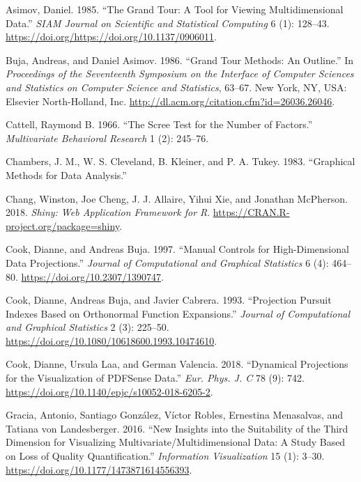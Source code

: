 \documentclass[11,]{article}
\begin{document}
\leavevmode\hypertarget{ref-asimov_grand_1985}{}%
Asimov, Daniel. 1985. ``The Grand Tour: A Tool for Viewing Multidimensional Data.'' \emph{SIAM Journal on Scientific and Statistical Computing} 6 (1): 128--43. \url{https://doi.org/https://doi.org/10.1137/0906011}.

\leavevmode\hypertarget{ref-buja_grand_1986}{}%
Buja, Andreas, and Daniel Asimov. 1986. ``Grand Tour Methods: An Outline.'' In \emph{Proceedings of the Seventeenth Symposium on the Interface of Computer Sciences and Statistics on Computer Science and Statistics}, 63--67. New York, NY, USA: Elsevier North-Holland, Inc. \url{http://dl.acm.org/citation.cfm?id=26036.26046}.

\leavevmode\hypertarget{ref-cattell_scree_1966}{}%
Cattell, Raymond B. 1966. ``The Scree Test for the Number of Factors.'' \emph{Multivariate Behavioral Research} 1 (2): 245--76.

\leavevmode\hypertarget{ref-chambers_graphical_1983}{}%
Chambers, J. M., W. S. Cleveland, B. Kleiner, and P. A. Tukey. 1983. ``Graphical Methods for Data Analysis.''

\leavevmode\hypertarget{ref-chang_shiny:_2018}{}%
Chang, Winston, Joe Cheng, J. J. Allaire, Yihui Xie, and Jonathan McPherson. 2018. \emph{Shiny: Web Application Framework for R}. \url{https://CRAN.R-project.org/package=shiny}.

\leavevmode\hypertarget{ref-cook_manual_1997}{}%
Cook, Dianne, and Andreas Buja. 1997. ``Manual Controls for High-Dimensional Data Projections.'' \emph{Journal of Computational and Graphical Statistics} 6 (4): 464--80. \url{https://doi.org/10.2307/1390747}.

\leavevmode\hypertarget{ref-cook_projection_1993}{}%
Cook, Dianne, Andreas Buja, and Javier Cabrera. 1993. ``Projection Pursuit Indexes Based on Orthonormal Function Expansions.'' \emph{Journal of Computational and Graphical Statistics} 2 (3): 225--50. \url{https://doi.org/10.1080/10618600.1993.10474610}.

\leavevmode\hypertarget{ref-cook_dynamical_2018}{}%
Cook, Dianne, Ursula Laa, and German Valencia. 2018. ``Dynamical Projections for the Visualization of PDFSense Data.'' \emph{Eur. Phys. J. C} 78 (9): 742. \url{https://doi.org/10.1140/epjc/s10052-018-6205-2}.

\leavevmode\hypertarget{ref-gracia_new_2016}{}%
Gracia, Antonio, Santiago González, Víctor Robles, Ernestina Menasalvas, and Tatiana von Landesberger. 2016. ``New Insights into the Suitability of the Third Dimension for Visualizing Multivariate/Multidimensional Data: A Study Based on Loss of Quality Quantification.'' \emph{Information Visualization} 15 (1): 3--30. \url{https://doi.org/10.1177/1473871614556393}.
\end{document}
